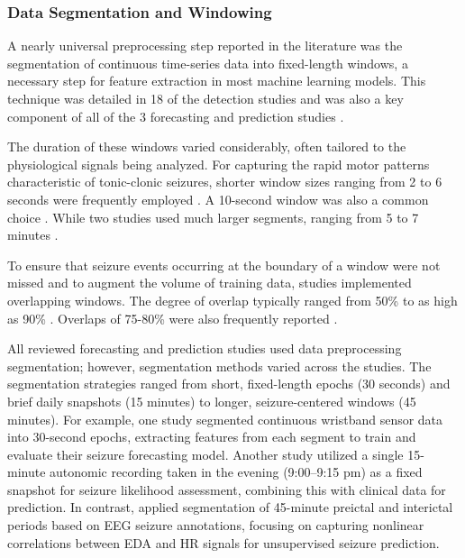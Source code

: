 \subsubsection{Data Segmentation and Windowing}
A nearly universal preprocessing step reported in the literature was the segmentation of continuous time-series data into fixed-length windows, a necessary step for feature extraction in most machine learning models. This technique was detailed in 18 of the detection studies \cite{Milosevic2016-ee, De_Cooman2018-pq, Cogan2017-lg, Hamlin2021-sd, Wang2022-lt, Poh2012-af, Wu2024-yl, Nasseri2021-xn, Vakilna2024-hk, Larsen2024-vn, Dong2022-oo, Li2022-ty, Xu2022-tx, Wang2025-ql, Jiang2022-zu, Wang2025-my, Hegarty-Craver2021-hk, Chowdhury2022-bi} and was also a key component of all of the 3 forecasting and prediction studies \cite{Meisel2020-ii, Vieluf2023-zv, Vieluf2023-ta}.

The duration of these windows varied considerably, often tailored to the physiological signals being analyzed. For capturing the rapid motor patterns characteristic of tonic-clonic seizures, shorter window sizes ranging from 2 to 6 seconds were frequently employed \cite{Milosevic2016-ee, De_Cooman2018-pq, Dong2022-oo, Cogan2017-lg, Hamlin2021-sd, Wu2024-yl, Xu2022-tx, Wang2025-ql, Wang2025-my}. A 10-second window was also a common choice \cite{Poh2012-af, Nasseri2021-xn, Larsen2024-vn, Li2022-ty}. While two studies used much larger segments, ranging from 5 to 7 minutes \cite{Jiang2022-zu, Vakilna2024-hk}.

To ensure that seizure events occurring at the boundary of a window were not missed and to augment the volume of training data, studies implemented overlapping windows. The degree of overlap typically ranged from 50\% \cite{Hamlin2021-sd, Dong2022-oo, Wang2025-ql, Vakilna2024-hk} to as high as 90\% \cite{Wang2022-lt, Larsen2024-vn}. Overlaps of 75-80\% were also frequently reported \cite{Milosevic2016-ee, De_Cooman2018-pq, Cogan2017-lg, Poh2012-af, Wu2024-yl, Jiang2022-zu}.

All reviewed forecasting and prediction studies used data preprocessing segmentation; however, segmentation methods varied across the studies. The segmentation strategies ranged from short, fixed-length epochs (30 seconds) and brief daily snapshots (15 minutes) to longer, seizure-centered windows (45 minutes). For example, one study \cite{Meisel2020-ii} segmented continuous wristband sensor data into 30-second epochs, extracting features from each segment to train and evaluate their seizure forecasting model. Another study \cite{Vieluf2023-zv} utilized a single 15-minute autonomic recording taken in the evening (9:00–9:15 pm) as a fixed snapshot for seizure likelihood assessment, combining this with clinical data for prediction. In contrast, \cite{Vieluf2023-ta} applied segmentation of 45-minute preictal and interictal periods based on EEG seizure annotations, focusing on capturing nonlinear correlations between EDA and HR signals for unsupervised seizure prediction.


